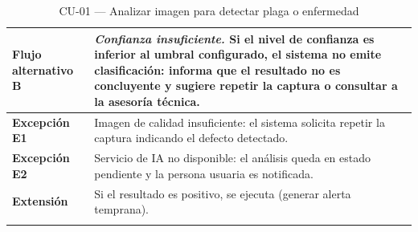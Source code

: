 \begin{longtable}{|L{3.4cm}|L{12.0cm}|}
\textbf{Flujo alternativo B} & \emph{Confianza insuficiente.} Si el nivel de confianza es inferior al umbral configurado, el sistema no emite clasificación: informa que el resultado no es concluyente y sugiere repetir la captura o consultar a la asesoría técnica. \\ \hline
\textbf{Excepción E1} & Imagen de calidad insuficiente: el sistema solicita repetir la captura indicando el defecto detectado. \\ \hline
\textbf{Excepción E2} & Servicio de IA no disponible: el análisis queda en estado pendiente y la persona usuaria es notificada. \\ \hline
\textbf{Extensión} & Si el resultado es positivo, se ejecuta  (generar alerta temprana). \\ \hline
\caption{CU-01 --- Analizar imagen para detectar plaga o enfermedad}
\end{longtable}

